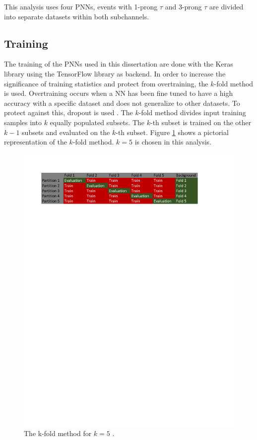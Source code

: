 			This analysis uses four PNNs, events with 1-prong $\tau$ and 3-prong $\tau$ are divided into separate datasets within both subchannels.

		\subsection{Training}\label{ssec:training}
			The training of the PNNs used in this dissertation are done with the Keras \cite{keras} library using the TensorFlow \cite{tensorflow2015-whitepaper} library as backend. In order to increase the significance of training statistics and protect from overtraining, the $k$-fold method is used. Overtraining occurs when a NN has been fine tuned to have a high accuracy with a specific dataset and does not generalize to other datasets. To protect against this, dropout is used \cite{dropout}. The $k$-fold method divides input training samples into $k$ equally populated subsets. The $k$-th subset is trained on the other $k-1$ subsets and evaluated on the $k$-th subset. Figure \ref{fig:k-fold-diagram} shows a pictorial representation of the $k$-fold method. $k=5$ is chosen in this analysis.

			\begin{figure}	
				\begin{center}
					\includegraphics[width=.75\textwidth,keepaspectratio=true]{chapters/chapter6_HPlus/images/kFoldDiagram_noValid.pdf}
				\end{center}
				\caption{The k-fold method for $k=5$ \cite{Burghgrave:2018uwq}.}
				\label{fig:k-fold-diagram}
			\end{figure}	

